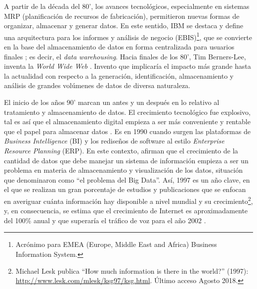 \bigskip A partir de la década del 80', los avances tecnológicos, especialmente en sistemas MRP (planificación de recursos de fabricación), permitieron nuevas formas de organizar, almacenar y generar datos. En este sentido, IBM se destaca y define una arquitectura para los informes y análisis de negocio (EBIS)\footnote{Acrónimo para EMEA (Europe, Middle East and Africa) Business Information System.}, que se convierte en la base del almacenamiento de datos en forma centralizada para usuarios finales \citep{devlin1988architecture}; es decir, el \textit{data warehousing}. Hacia finales de los 80’, Tim Berners-Lee, inventa la \textit{World Wide Web} \citep{berners1992world}. Invento que implicaría el impacto más grande hasta la actualidad con respecto a la generación, identificación, almacenamiento y análisis de grandes volúmenes de datos de diversa naturaleza.

\bigskip El inicio de los años 90’ marcan un antes y un después en lo relativo al tratamiento y almacenamiento de datos. El crecimiento tecnológico fue explosivo, tal es así que el almacenamiento digital empieza a ser más conveniente y rentable que el papel para almacenar datos \citep{morris2003evolution}. Es en 1990 cuando surgen las plataformas de \textit{Business Intelligence} (BI) y los rediseños de software al estilo \textit{Enterprise Resource Planning} (ERP). En este contexto, \cite{cox1997application} afirman que el crecimiento de la cantidad de datos que debe manejar un sistema de información empieza a ser un problema en materia de almacenamiento y visualización de los datos, situación que denominaron como “el problema del Big Data”. Así, 1997 es un año clave, en el que se realizan un gran porcentaje de estudios y publicaciones que se enfocan en averiguar cuánta información hay disponible a nivel mundial y su crecimiento\footnote{Michael Lesk publica “How much information is there in the world?” (1997): \url{http://www.lesk.com/mlesk/ksg97/ksg.html}. Último acceso Agosto 2018.}, y, en consecuencia, se estima que el crecimiento de Internet es aproximadamente del 100\% anual y que superaría el tráfico de voz para el año 2002 \citep{coffman1998size}.

